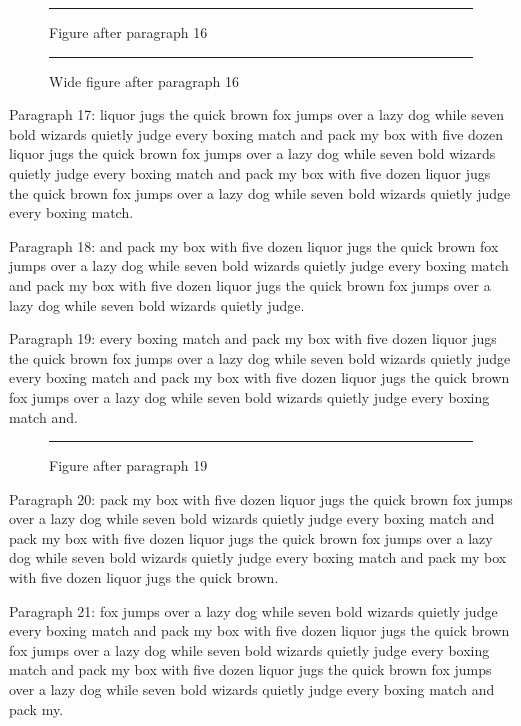 \documentclass[twocolumn]{article}
\begin{document}
\begin{figure}[htbp]\centering\rule{0.8\columnwidth}{5em}\caption{Figure after paragraph 16}\end{figure}
\begin{figure}[t]\centering\rule{0.7\textwidth}{6em}\caption{Wide figure after paragraph 16}\end{figure}
Paragraph 17: liquor jugs the quick brown fox jumps over a lazy dog while seven bold wizards quietly judge every boxing match and pack my box with five dozen liquor jugs the quick brown fox jumps over a lazy dog while seven bold wizards quietly judge every boxing match and pack my box with five dozen liquor jugs the quick brown fox jumps over a lazy dog while seven bold wizards quietly judge every boxing match.

Paragraph 18: and pack my box with five dozen liquor jugs the quick brown fox jumps over a lazy dog while seven bold wizards quietly judge every boxing match and pack my box with five dozen liquor jugs the quick brown fox jumps over a lazy dog while seven bold wizards quietly judge.

Paragraph 19: every boxing match and pack my box with five dozen liquor jugs the quick brown fox jumps over a lazy dog while seven bold wizards quietly judge every boxing match and pack my box with five dozen liquor jugs the quick brown fox jumps over a lazy dog while seven bold wizards quietly judge every boxing match and.

\begin{figure}[tbp]\centering\rule{0.8\columnwidth}{8em}\caption{Figure after paragraph 19}\end{figure}
Paragraph 20: pack my box with five dozen liquor jugs the quick brown fox jumps over a lazy dog while seven bold wizards quietly judge every boxing match and pack my box with five dozen liquor jugs the quick brown fox jumps over a lazy dog while seven bold wizards quietly judge every boxing match and pack my box with five dozen liquor jugs the quick brown.

Paragraph 21: fox jumps over a lazy dog while seven bold wizards quietly judge every boxing match and pack my box with five dozen liquor jugs the quick brown fox jumps over a lazy dog while seven bold wizards quietly judge every boxing match and pack my box with five dozen liquor jugs the quick brown fox jumps over a lazy dog while seven bold wizards quietly judge every boxing match and pack my.
\end{document}
